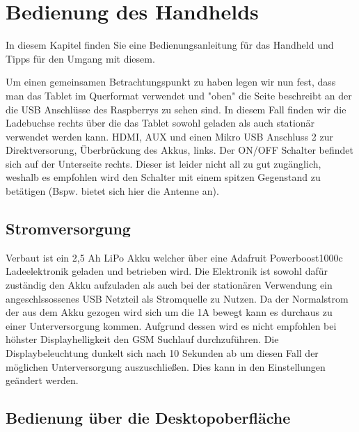 %
%

\chapter{Bedienung des Handhelds}
In diesem Kapitel finden Sie eine Bedienungsanleitung für das Handheld und Tipps für den Umgang mit diesem.

Um einen gemeinsamen Betrachtungspunkt zu haben legen wir nun fest, dass man das Tablet im Querformat verwendet und "oben" die Seite beschreibt an der die USB Anschlüsse des Raspberrys zu sehen sind. In diesem Fall finden wir die Ladebuchse rechts über die das Tablet sowohl geladen als auch stationär verwendet werden kann. HDMI, AUX und einen Mikro USB Anschluss 2 zur Direktversorung, Überbrückung des Akkus, links. Der ON/OFF Schalter befindet sich auf der Unterseite rechts. Dieser ist leider nicht all zu gut zugänglich, weshalb es empfohlen wird den Schalter mit einem spitzen Gegenstand zu betätigen (Bspw. bietet sich hier die Antenne an).


\section{Stromversorgung}

Verbaut ist ein 2,5 Ah LiPo Akku welcher über eine Adafruit Powerboost1000c Ladeelektronik geladen und betrieben wird. Die Elektronik ist sowohl dafür zuständig den Akku aufzuladen als auch bei der stationären Verwendung ein angeschlssossenes USB Netzteil als Stromquelle zu Nutzen. Da der Normalstrom der aus dem Akku gezogen wird sich um die 1A bewegt kann es durchaus zu einer Unterversorgung kommen. Aufgrund dessen wird es nicht empfohlen bei höhster Displayhelligkeit den GSM Suchlauf durchzuführen. Die Displaybeleuchtung dunkelt sich nach 10 Sekunden ab um diesen Fall der möglichen Unterversorgung auszuschließen. Dies kann in den Einstellungen geändert werden. 


\section{Bedienung über die Desktopoberfläche}

